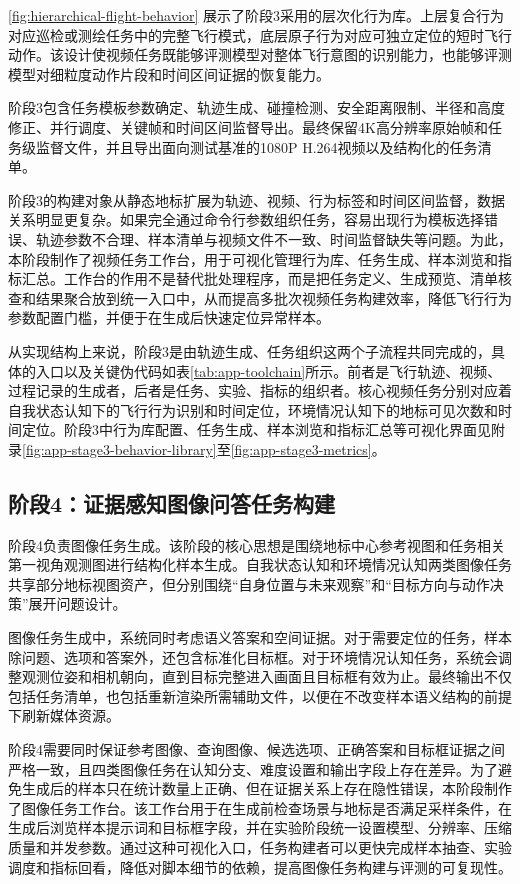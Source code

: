 \autoref{fig:hierarchical-flight-behavior} 展示了阶段3采用的层次化行为库。上层复合行为对应巡检或测绘任务中的完整飞行模式，底层原子行为对应可独立定位的短时飞行动作。该设计使视频任务既能够评测模型对整体飞行意图的识别能力，也能够评测模型对细粒度动作片段和时间区间证据的恢复能力。

阶段3包含任务模板参数确定、轨迹生成、碰撞检测、安全距离限制、半径和高度修正、并行调度、关键帧和时间区间监督导出。最终保留4K高分辨率原始帧和任务级监督文件，并且导出面向测试基准的1080P H.264视频以及结构化的任务清单。

阶段3的构建对象从静态地标扩展为轨迹、视频、行为标签和时间区间监督，数据关系明显更复杂。如果完全通过命令行参数组织任务，容易出现行为模板选择错误、轨迹参数不合理、样本清单与视频文件不一致、时间监督缺失等问题。为此，本阶段制作了视频任务工作台，用于可视化管理行为库、任务生成、样本浏览和指标汇总。工作台的作用不是替代批处理程序，而是把任务定义、生成预览、清单核查和结果聚合放到统一入口中，从而提高多批次视频任务构建效率，降低飞行行为参数配置门槛，并便于在生成后快速定位异常样本。

从实现结构上来说，阶段3是由轨迹生成、任务组织这两个子流程共同完成的，具体的入口以及关键伪代码如表\autoref{tab:app-toolchain}所示。前者是飞行轨迹、视频、过程记录的生成者，后者是任务、实验、指标的组织者。核心视频任务分别对应着自我状态认知下的飞行行为识别和时间定位，环境情况认知下的地标可见次数和时间定位。阶段3中行为库配置、任务生成、样本浏览和指标汇总等可视化界面见附录\autoref{fig:app-stage3-behavior-library}至\autoref{fig:app-stage3-metrics}。

\subsection{阶段4：证据感知图像问答任务构建}

阶段4负责图像任务生成。该阶段的核心思想是围绕地标中心参考视图和任务相关第一视角观测图进行结构化样本生成。自我状态认知和环境情况认知两类图像任务共享部分地标视图资产，但分别围绕“自身位置与未来观察”和“目标方向与动作决策”展开问题设计。

图像任务生成中，系统同时考虑语义答案和空间证据。对于需要定位的任务，样本除问题、选项和答案外，还包含标准化目标框。对于环境情况认知任务，系统会调整观测位姿和相机朝向，直到目标完整进入画面且目标框有效为止。最终输出不仅包括任务清单，也包括重新渲染所需辅助文件，以便在不改变样本语义结构的前提下刷新媒体资源。

阶段4需要同时保证参考图像、查询图像、候选选项、正确答案和目标框证据之间严格一致，且四类图像任务在认知分支、难度设置和输出字段上存在差异。为了避免生成后的样本只在统计数量上正确、但在证据关系上存在隐性错误，本阶段制作了图像任务工作台。该工作台用于在生成前检查场景与地标是否满足采样条件，在生成后浏览样本提示词和目标框字段，并在实验阶段统一设置模型、分辨率、压缩质量和并发参数。通过这种可视化入口，任务构建者可以更快完成样本抽查、实验调度和指标回看，降低对脚本细节的依赖，提高图像任务构建与评测的可复现性。

